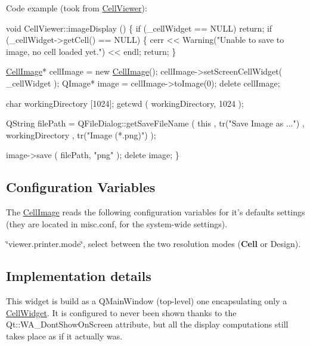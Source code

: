 Code example (took from \hyperlink{classHurricane_1_1CellViewer}{Cell\-Viewer})\-: 
\begin{DoxyCode}
\textcolor{keywordtype}{void}  CellViewer::imageDisplay ()
\{
  \textcolor{keywordflow}{if} (\_cellWidget == NULL) \textcolor{keywordflow}{return};
  \textcolor{keywordflow}{if} (\_cellWidget->getCell() == NULL) \{
    cerr << Warning(\textcolor{stringliteral}{"Unable to save to image, no cell loaded yet."}) << endl;
    \textcolor{keywordflow}{return};
  \}

  \hyperlink{classHurricane_1_1CellImage_a3f73f1a3a90d4625a5e0b31711affc34}{CellImage}* cellImage = \textcolor{keyword}{new} \hyperlink{classHurricane_1_1CellImage_a3f73f1a3a90d4625a5e0b31711affc34}{CellImage}();
  cellImage->setScreenCellWidget( \_cellWidget );
  QImage* image = cellImage->toImage(0);
  \textcolor{keyword}{delete} cellImage;

  \textcolor{keywordtype}{char} workingDirectory [1024];
  getcwd ( workingDirectory, 1024 );

  QString filePath = QFileDialog::getSaveFileName ( \textcolor{keyword}{this}
                                                  , tr(\textcolor{stringliteral}{"Save Image as ..."})
                                                  , workingDirectory
                                                  , tr(\textcolor{stringliteral}{"Image (*.png)"})
                                                  );

  image->save ( filePath, \textcolor{stringliteral}{"png"} );
  \textcolor{keyword}{delete} image;
\}
\end{DoxyCode}
\hypertarget{classHurricane_1_1CellImage_secImageConfiguration}{}\subsection{Configuration Variables}\label{classHurricane_1_1CellImage_secImageConfiguration}
The \hyperlink{classHurricane_1_1CellImage}{Cell\-Image} reads the following configuration variables for it's defaults settings (they are located in {\ttfamily misc.\-conf}, for the system-\/wide settings). 
\begin{DoxyItemize}
\item {\ttfamily \char`\"{}viewer.\-printer.\-mode\char`\"{}}, select between the two resolution modes ({\bf Cell} or Design). 
\end{DoxyItemize}\hypertarget{classHurricane_1_1CellImage_secImageImplDetails}{}\subsection{Implementation details}\label{classHurricane_1_1CellImage_secImageImplDetails}
This widget is build as a Q\-Main\-Window (top-\/level) one encapsulating only a \hyperlink{classHurricane_1_1CellWidget}{Cell\-Widget}. It is configured to never been shown thanks to the {\ttfamily Qt\-::\-W\-A\-\_\-\-Dont\-Show\-On\-Screen} attribute, but all the display computations still takes place as if it actually was.

